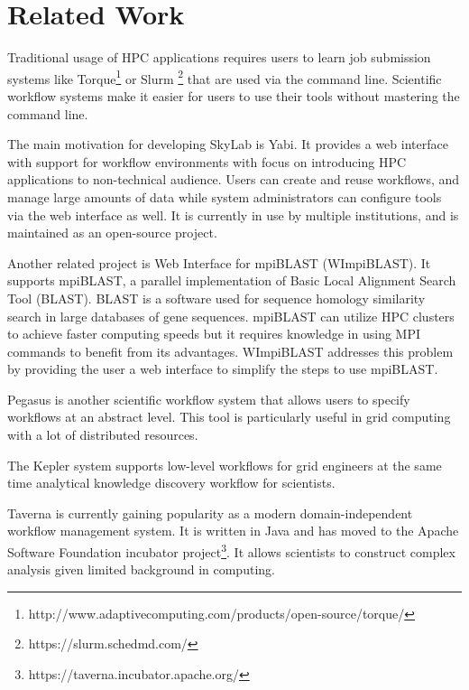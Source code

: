 \section{Related Work}
Traditional usage of HPC applications requires users to learn job submission systems like Torque\footnote{http://www.adaptivecomputing.com/products/open-source/torque/} or Slurm \footnote{https://slurm.schedmd.com/} that are used via the command line. Scientific workflow systems make it easier for users to use their tools without mastering the command line.

The main motivation for developing SkyLab is Yabi\cite{7411021620120101}. It provides a web interface with support for workflow environments with focus on introducing HPC applications to non-technical audience. Users can create and reuse workflows, and manage large amounts of data while system administrators can configure tools via the web interface as well. It is currently in use by multiple institutions, and is maintained as an open-source project.	    	    
	    
Another related project is Web Interface for mpiBLAST (WImpiBLAST). It supports mpiBLAST, a parallel implementation of Basic Local Alignment Search Tool (BLAST). BLAST is a software used for sequence homology similarity search in large databases of gene sequences. mpiBLAST can utilize HPC clusters to achieve faster computing speeds but it requires knowledge in using MPI commands to benefit from its advantages. WImpiBLAST addresses this problem by providing the user a web interface to simplify the steps to use mpiBLAST\cite{9686120720140601}.   
	
Pegasus \cite{deelman2005pegasus} is another scientific workflow system that allows users to specify workflows at an abstract level. This tool is particularly useful in grid computing with a lot of distributed resources.

The Kepler \cite{ludascher2006scientific} system supports low-level workflows for grid engineers at the same time analytical knowledge discovery workflow for scientists.	

Taverna \cite{hull2006taverna} is currently gaining popularity as a modern domain-independent workflow management system. It is written in Java and has moved to the Apache Software Foundation incubator project\footnote{https://taverna.incubator.apache.org/}. It allows scientists to construct complex analysis given limited background in computing.  
	
